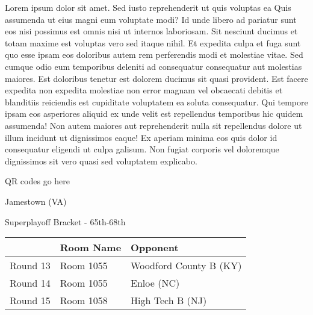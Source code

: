 \documentclass{article}%
\begin{document}
\vspace*{8pt}%
\linebreak%
\newline%
\newline%
Lorem ipsum dolor sit amet. Sed iusto reprehenderit ut quis voluptas ea Quis assumenda ut eius magni eum voluptate modi? Id unde libero ad pariatur sunt eos nisi possimus est omnis nisi ut internos laboriosam. Sit nesciunt ducimus et totam maxime est voluptas vero sed itaque nihil. Et expedita culpa et fuga sunt quo esse ipsam eos doloribus autem rem perferendis modi et molestiae vitae.\newline%
\newline%
Sed cumque odio eum temporibus deleniti ad consequatur consequatur aut molestias maiores. Est doloribus tenetur est dolorem ducimus sit quasi provident. Est facere expedita non expedita molestiae non error magnam vel obcaecati debitis et blanditiis reiciendis est cupiditate voluptatem ea soluta consequatur. Qui tempore ipsam eos asperiores aliquid ex unde velit est repellendus temporibus hic quidem assumenda!\newline%
\newline%
Non autem maiores aut reprehenderit nulla sit repellendus dolore ut illum incidunt ut dignissimos eaque! Ex aperiam minima eos quis dolor id consequatur eligendi ut culpa galisum. Non fugiat corporis vel doloremque dignissimos sit vero quasi sed voluptatem explicabo.\newline%
\newline%
%
\vspace*{30pt}%
\begin{center}%
\begin{Huge}%
QR codes go here%
\end{Huge}%
\end{center}%
\newpage%
\begin{center}%
\begin{Huge}%
Jamestown (VA)%
\end{Huge}%
\vspace*{8pt}%
\linebreak%
\begin{Large}%
Superplayoff Bracket {-} 65th{-}68th%
\end{Large}%
\end{center}%
%
\begin{tabularx}{\textwidth}{|c|Y|Y|}%
\hline%
&Room Name&Opponent\\%
\hline%
Round 13&Room 1055&Woodford County B (KY)\\%
Round 14&Room 1055&Enloe (NC)\\%
Round 15&Room 1058&High Tech B (NJ)\\%
\hline%
\end{tabularx}%
\end{document}

